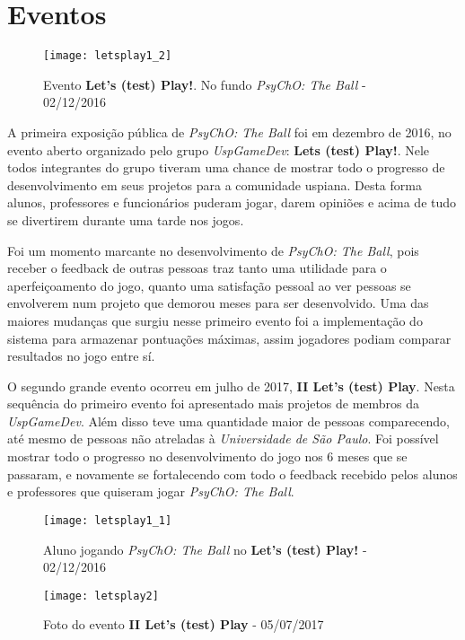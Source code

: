 \section{Eventos}
\label{sec:eventos}


\begin{figure}[h]
\texttt{[image: letsplay1\_2]}
\centering
\caption{Evento \textbf{Let's (test) Play!}. No fundo \textit{PsyChO: The Ball} - 02/12/2016}
\end{figure}

A primeira exposição pública de \textit{PsyChO: The Ball} foi em dezembro de 2016, no evento aberto organizado pelo grupo \textit{UspGameDev}: \textbf{Lets (test) Play!}. Nele todos integrantes do grupo tiveram uma chance de mostrar todo o progresso de desenvolvimento em seus projetos para a comunidade uspiana. Desta forma alunos, professores e funcionários puderam jogar, darem opiniões e acima de tudo se divertirem durante uma tarde nos jogos.

Foi um momento marcante no desenvolvimento de \textit{PsyChO: The Ball}, pois receber o feedback de outras pessoas traz tanto uma utilidade para o aperfeiçoamento do jogo, quanto uma satisfação pessoal ao ver pessoas se envolverem num projeto que demorou meses para ser desenvolvido. Uma das maiores mudanças que surgiu nesse primeiro evento foi a implementação do sistema para armazenar pontuações máximas, assim jogadores podiam comparar resultados no jogo entre sí.

O segundo grande evento ocorreu em julho de 2017, \textbf{II Let's (test) Play}. Nesta sequência do primeiro evento foi apresentado mais projetos de membros da \textit{UspGameDev}. Além disso teve uma quantidade maior de pessoas comparecendo, até mesmo de pessoas não atreladas à \textit{Universidade de São Paulo}. Foi possível mostrar todo o progresso no desenvolvimento do jogo nos 6 meses que se passaram, e novamente se fortalecendo com todo o feedback recebido pelos alunos e professores que quiseram jogar \textit{PsyChO: The Ball}.

\begin{figure}[h!]
  \texttt{[image: letsplay1\_1]}
  \centering
  \caption{Aluno jogando \textit{PsyChO: The Ball} no \textbf{Let's (test) Play!} - 02/12/2016}
\end{figure}

\begin{figure}[h]
\texttt{[image: letsplay2]}
\centering
\caption{Foto do evento \textbf{II Let's (test) Play} - 05/07/2017}
\end{figure}

